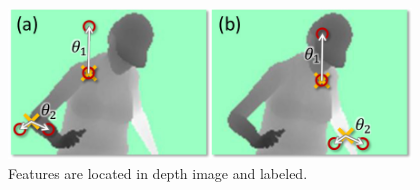 \begin{figure}
	[h] \centering 
	\includegraphics[height=4cm]{figures/content/ni-label.jpg} \caption{Features are located in depth image and labeled. \cite{13}} \label{fg:ni:label} 
\end{figure}
